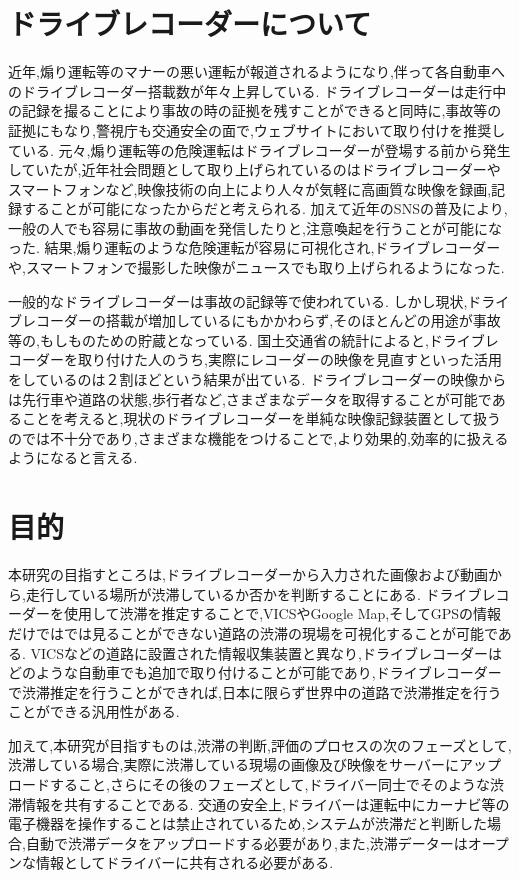 \newpage

\section{ドライブレコーダーについて}
近年,煽り運転等のマナーの悪い運転が報道されるようになり,伴って各自動車へのドライブレコーダー搭載数が年々上昇している.
ドライブレコーダーは走行中の記録を撮ることにより事故の時の証拠を残すことができると同時に,事故等の証拠にもなり,警視庁も交通安全の面で,ウェブサイトにおいて取り付けを推奨している.
元々,煽り運転等の危険運転はドライブレコーダーが登場する前から発生していたが,近年社会問題として取り上げられているのはドライブレコーダーやスマートフォンなど,映像技術の向上により人々が気軽に高画質な映像を録画,記録することが可能になったからだと考えられる.
加えて近年のSNSの普及により,一般の人でも容易に事故の動画を発信したりと,注意喚起を行うことが可能になった.
結果,煽り運転のような危険運転が容易に可視化され,ドライブレコーダーや,スマートフォンで撮影した映像がニュースでも取り上げられるようになった.

一般的なドライブレコーダーは事故の記録等で使われている.
しかし現状,ドライブレコーダーの搭載が増加しているにもかかわらず,そのほとんどの用途が事故等の,もしものための貯蔵となっている.
国土交通省の統計によると,ドライブレコーダーを取り付けた人のうち,実際にレコーダーの映像を見直すといった活用をしているのは２割ほどという結果が出ている\cite{ministryofland}.
ドライブレコーダーの映像からは先行車や道路の状態,歩行者など,さまざまなデータを取得することが可能であることを考えると,現状のドライブレコーダーを単純な映像記録装置として扱うのでは不十分であり,さまざまな機能をつけることで,より効果的,効率的に扱えるようになると言える.

\section{目的}
本研究の目指すところは,ドライブレコーダーから入力された画像および動画から,走行している場所が渋滞しているか否かを判断することにある.
ドライブレコーダーを使用して渋滞を推定することで,VICSやGoogle Map,そしてGPSの情報だけではでは見ることができない道路の渋滞の現場を可視化することが可能である.
VICSなどの道路に設置された情報収集装置と異なり,ドライブレコーダーはどのような自動車でも追加で取り付けることが可能であり,ドライブレコーダーで渋滞推定を行うことができれば,日本に限らず世界中の道路で渋滞推定を行うことができる汎用性がある.

加えて,本研究が目指すものは,渋滞の判断,評価のプロセスの次のフェーズとして,渋滞している場合,実際に渋滞している現場の画像及び映像をサーバーにアップロードすること,さらにその後のフェーズとして,ドライバー同士でそのような渋滞情報を共有することである.
交通の安全上,ドライバーは運転中にカーナビ等の電子機器を操作することは禁止されているため,システムが渋滞だと判断した場合,自動で渋滞データをアップロードする必要があり,また,渋滞データーはオープンな情報としてドライバーに共有される必要がある.

